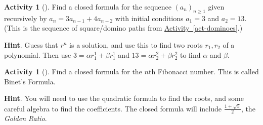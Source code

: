 \documentclass[10pt,]{book}
\theoremstyle{plain}
\theoremstyle{definition}
\theoremstyle{definition}
\theoremstyle{definition}
\newtheorem{activity}[project]{Activity}
\theoremstyle{definition}
\numberwithin{equation}{chapter}
\begin{document}
\begin{activity}[]\label{activity-92}
\hypertarget{p-859}{}%
Find a closed formula for the sequence \((a_n)_{n \ge 1}\) given recursively by \(a_n = 3a_{n-1} + 4a_{n-2}\) with initial conditions \(a_1 = 3\) and \(a_2 = 13\).  (This is the sequence of square/domino paths from \hyperref[act-dominoes]{Activity~\ref{act-dominoes}}.)%
\par\smallskip%
\noindent\textbf{Hint}.\hypertarget{hint-85}{}\quad%
\hypertarget{p-860}{}%
Guess that \(r^n\) is a solution, and use this to find two roots \(r_1, r_2\) of a polynomial.  Then use \(3 = \alpha r_1^1 + \beta r_1^1\) and \(13 = \alpha r_2^2 + \beta r_2^2\) to find \(\alpha\) and \(\beta\).%
\end{activity}
\begin{activity}[]\label{act-binet}
\hypertarget{p-861}{}%
Find a closed formula for the \(n\)th Fibonacci number.  This is called Binet's Formula.%
\par\smallskip%
\noindent\textbf{Hint}.\hypertarget{hint-86}{}\quad%
\hypertarget{p-862}{}%
You will need to use the quadratic formula to find the roots, and some careful algebra to find the coefficients.  The closed formula will include \(\frac{1+\sqrt{5}}{2}\), the \emph{Golden Ratio}.%
\end{activity}
\typeout{************************************************}
\typeout{************************************************}
\end{document}
